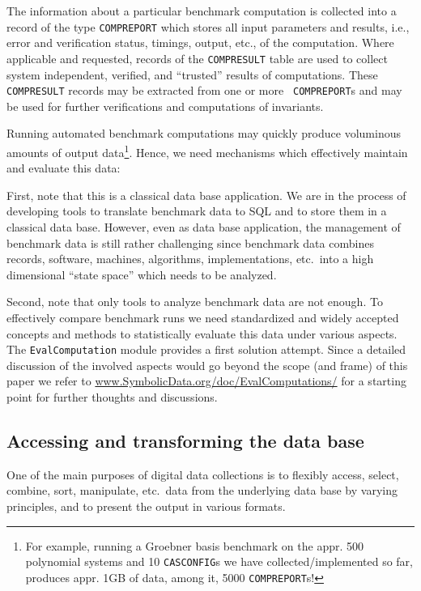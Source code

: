 \documentclass[11pt,a4paper]{article}
\begin{document}
The information about a particular benchmark computation is collected
into a record of the type {\tt COMPREPORT} which stores all input
parameters and results, i.e., error and verification status, timings,
output, etc., of the computation. Where applicable and requested,
records of the {\tt COMPRESULT} table are used to collect system
independent, verified, and ``trusted'' results of computations. These
{\tt COMPRESULT} records may be extracted from one or more {\tt
COMPREPORT}s and may be used for further verifications and
computations of invariants.
\medskip

Running automated benchmark computations may quickly produce
voluminous amounts of output data\footnote{For example, running a
Groebner basis benchmark on the appr. 500 polynomial systems and 10
{\tt CASCONFIG}s we have collected/implemented so far, produces
appr. 1GB of data, among it, 5000 {\tt COMPREPORT}s!}. Hence, we need
mechanisms which effectively maintain and evaluate this data:

First, note that this is a classical data base application. We are 
in the process of developing tools to translate benchmark data to SQL and
to store them in a classical data base. However, even as data base
application, the management of benchmark data is still rather
challenging since benchmark data combines records, software, machines,
algorithms, implementations, etc.\ into a high dimensional ``state
space'' which needs to be analyzed. 

Second, note that only tools to analyze benchmark data are not enough.
To effectively compare benchmark runs we need standardized
and widely accepted concepts and methods to statistically evaluate
this data under 
various aspects. The {\tt EvalComputation} module provides a first
solution attempt. Since a detailed discussion of the involved aspects
would go beyond the scope (and frame) of this paper we refer to
\url{www.SymbolicData.org/doc/EvalComputations/} for a starting point
for further thoughts and discussions.

\subsection{Accessing and transforming the data base}\label{goal_3}

One of the main purposes of digital data collections is to flexibly
access, select, combine, sort, manipulate, etc.\ data from the underlying
data base by varying principles, and to present the output in various
formats. 
\end{document}
